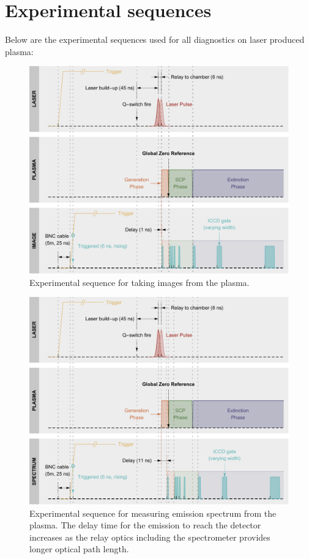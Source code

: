 
\chapter{Experimental sequences}
\label{sec:ap4}

Below are the experimental sequences used for all diagnostics on laser produced plasma:

\begin{figure}[ht!]
\centering
\includegraphics[width=130mm]{figures/ap4/sequence/imgSequence.pdf}
\caption{Experimental sequence for taking images from the plasma.}
\label{fig:imgSequence}
\end{figure}

\begin{figure}[ht!]
\centering
\includegraphics[width=130mm]{figures/ap4/sequence/specSequence.pdf}
\caption{Experimental sequence for measuring emission spectrum from the plasma. The delay time for the emission to reach the detector increases as the relay optics including the spectrometer provides longer optical path length.}
\label{fig:specSequence}
\end{figure}

